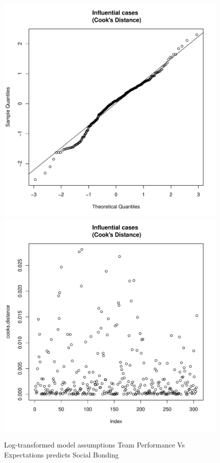 \begin{CJK}{UTF8}{gbsn}
\begin{figure}[htbp]
        \includegraphics[scale =.4]{images/MLM32aQQNorm.pdf}
        \includegraphics[scale =.4]{images/MLM32aCooksD.pdf}
        \caption{Log-transformed model assumptions Team Performance Vs Expectations predicts Social Bonding}
     \label{fig:MLM32aLogAssumptions}
    \end{figure}


      \end{CJK}
